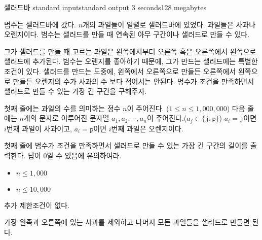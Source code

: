 \begin{problem}{샐러드바}
	{standard input}{standard output}
	{3 seconds}{128 megabytes}{}
	
	범수는 샐러드바에 갔다. $n$개의 과일들이 일렬로 샐러드바에 있었다. 과일들은 사과나 오렌지이다. 범수는 샐러드를 만들 때 연속된 아무 구간이나 샐러드로 만들 수 있다.
	
	그가 샐러드를 만들 때 고르는 과일은 왼쪽에서부터 오른쪽 혹은 오른쪽에서 왼쪽으로 샐러드에 추가된다. 범수는 오렌지를 좋아하기 때문에, 그가 만드는 샐러드에는 특별한 조건이 있다. 샐러드를 만드는 도중에, 왼쪽에서 오른쪽으로 만들든 오른쪽에서 왼쪽으로 만들든 오렌지의 수가 사과의 수 보다 적어서는 안된다. 범수가 조건을 만족하면서 샐러드로 만들 수 있는 가장 긴 구간을 구해주자. 
	
	\InputFile
	
	첫째 줄에는 과일의 수를 의미하는 정수 $n$이 주어진다. ($1 \le n \le 1,000,000$)
	다음 줄에는 $n$개의 문자로 이루어진 문자열 $a_1, a_2, \cdots, a_n$이 주어진다.($a_j \in \{\texttt{j},\texttt{p}\}$) $a_i = \texttt{j}$이면 $i$번재 과일이 사과이고, $a_i = \texttt{p}$이면 $i$번째 과일은 오렌지이다.
	
	
	
	\OutputFile
	첫째 줄에 범수가 조건을 만족하면서 샐러드로 만들 수 있는 가장 긴 구간의 길이를 출력한다. 답이 0일 수 있음에 유의하여라.  
	
	\begin{itemize}
		\item $n \le 1,000$
	\end{itemize}
	
	\begin{itemize}
		\item $n \le 10,000$
	\end{itemize}
	
	
	추가 제한조건이 없다.
	
	\Examples
		
	\begin{example}
	\end{example}
	
	\Note
	
	가장 왼족과 오른쪽에 있는 사과를 제외하고 나머지 모든 과일들을 샐러드로 만들면 된다.
	
\end{problem}

